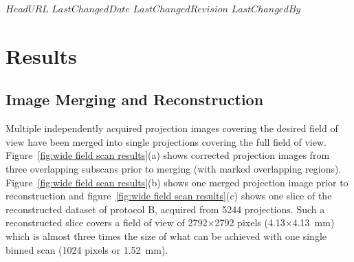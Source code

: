 \svnidlong
{$HeadURL$}
{$LastChangedDate$}
{$LastChangedRevision$}
{$LastChangedBy$}
%
%
\section{Results}\label{sec:Results}%
\subsection{Image Merging and Reconstruction}\label{sec:Image Merging and Reconstruction}%
Multiple independently acquired projection images covering the desired field of view have been merged into single projections covering the full field of view. Figure~\ref{fig:wide field scan results}(a) shows corrected projection images from three overlapping subscans prior to merging (with marked overlapping regions). Figure~\ref{fig:wide field scan results}(b) shows one merged projection image prior to reconstruction and figure~\ref{fig:wide field scan results}(c) shows one slice of the reconstructed dataset of protocol B, acquired from 5244 projections. Such a reconstructed slice covers a field of view of 2792$\times$2792 pixels (4.13$\times$\SI{4.13}{\milli\meter}) which is almost three times the size of what can be achieved with one single binned scan (1024 pixels or \SI{1.52}{\milli\meter}). %

